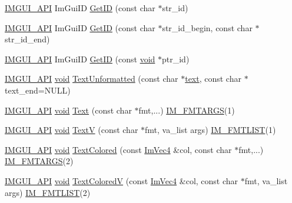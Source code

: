 \begin{DoxyCompactItemize}
\hyperlink{imgui_8h_a43829975e84e45d1149597467a14bbf5}{I\+M\+G\+U\+I\+\_\+\+A\+PI} Im\+Gui\+ID \hyperlink{namespaceImGui_a3329b04bd4235e90ad9deb00ffb38ae4}{Get\+ID} (const char $\ast$str\+\_\+id)
\item 
\hyperlink{imgui_8h_a43829975e84e45d1149597467a14bbf5}{I\+M\+G\+U\+I\+\_\+\+A\+PI} Im\+Gui\+ID \hyperlink{namespaceImGui_a26064d74efebef3aa86e1a78b3e4c333}{Get\+ID} (const char $\ast$str\+\_\+id\+\_\+begin, const char $\ast$str\+\_\+id\+\_\+end)
\item 
\hyperlink{imgui_8h_a43829975e84e45d1149597467a14bbf5}{I\+M\+G\+U\+I\+\_\+\+A\+PI} Im\+Gui\+ID \hyperlink{namespaceImGui_a220123ad62c2180ded92b2ef91f27c5a}{Get\+ID} (const \hyperlink{imgui__impl__opengl3__loader_8h_ac668e7cffd9e2e9cfee428b9b2f34fa7}{void} $\ast$ptr\+\_\+id)
\item 
\hyperlink{imgui_8h_a43829975e84e45d1149597467a14bbf5}{I\+M\+G\+U\+I\+\_\+\+A\+PI} \hyperlink{imgui__impl__opengl3__loader_8h_ac668e7cffd9e2e9cfee428b9b2f34fa7}{void} \hyperlink{namespaceImGui_a96a5f42789ecc419b2ae8af7b2acc28e}{Text\+Unformatted} (const char $\ast$\hyperlink{game__play__state_8cpp_a295b62c787445f811e691da4b10f6be4}{text}, const char $\ast$text\+\_\+end=N\+U\+LL)
\item 
\hyperlink{imgui_8h_a43829975e84e45d1149597467a14bbf5}{I\+M\+G\+U\+I\+\_\+\+A\+PI} \hyperlink{imgui__impl__opengl3__loader_8h_ac668e7cffd9e2e9cfee428b9b2f34fa7}{void} \hyperlink{namespaceImGui_a9e7b83611fe441d54fad2effb4bf4965}{Text} (const char $\ast$fmt,...) \hyperlink{imgui_8h_a1251c2f9ddac0873dbad8181bd82c9f1}{I\+M\+\_\+\+F\+M\+T\+A\+R\+GS}(1)
\item 
\hyperlink{imgui_8h_a43829975e84e45d1149597467a14bbf5}{I\+M\+G\+U\+I\+\_\+\+A\+PI} \hyperlink{imgui__impl__opengl3__loader_8h_ac668e7cffd9e2e9cfee428b9b2f34fa7}{void} \hyperlink{namespaceImGui_a10a0d6362178c2f743092f21e1b6cd20}{TextV} (const char $\ast$fmt, va\+\_\+list args) \hyperlink{imgui_8h_a047693beb7f899f5deab1e20202016b3}{I\+M\+\_\+\+F\+M\+T\+L\+I\+ST}(1)
\item 
\hyperlink{imgui_8h_a43829975e84e45d1149597467a14bbf5}{I\+M\+G\+U\+I\+\_\+\+A\+PI} \hyperlink{imgui__impl__opengl3__loader_8h_ac668e7cffd9e2e9cfee428b9b2f34fa7}{void} \hyperlink{namespaceImGui_a36ab8fcad68b26863d6e910755de04c2}{Text\+Colored} (const \hyperlink{structImVec4}{Im\+Vec4} \&col, const char $\ast$fmt,...) \hyperlink{imgui_8h_a1251c2f9ddac0873dbad8181bd82c9f1}{I\+M\+\_\+\+F\+M\+T\+A\+R\+GS}(2)
\item 
\hyperlink{imgui_8h_a43829975e84e45d1149597467a14bbf5}{I\+M\+G\+U\+I\+\_\+\+A\+PI} \hyperlink{imgui__impl__opengl3__loader_8h_ac668e7cffd9e2e9cfee428b9b2f34fa7}{void} \hyperlink{namespaceImGui_a87c24ece994188a7145d8feecb4439ed}{Text\+ColoredV} (const \hyperlink{structImVec4}{Im\+Vec4} \&col, const char $\ast$fmt, va\+\_\+list args) \hyperlink{imgui_8h_a047693beb7f899f5deab1e20202016b3}{I\+M\+\_\+\+F\+M\+T\+L\+I\+ST}(2)

\end{DoxyCompactItemize}
